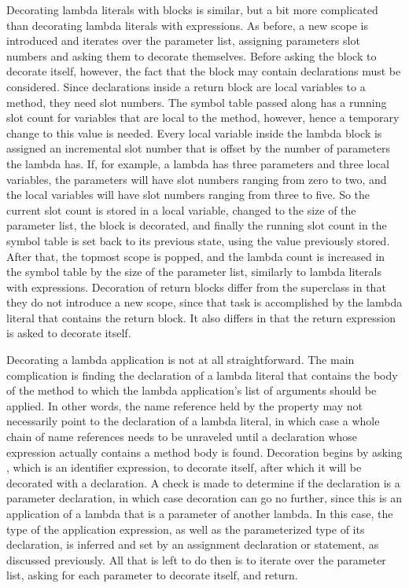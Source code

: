 Decorating lambda literals with blocks is similar, but a bit more complicated than decorating lambda literals with expressions. As before, a new scope is introduced and  iterates over the parameter list, assigning parameters slot numbers and asking them to decorate themselves. Before asking the block to decorate itself, however, the fact that the block may contain declarations must be considered. Since declarations inside a return block are local variables to a method, they need slot numbers. The symbol table passed along has a running slot count for variables that are local to the  method, however, hence a temporary change to this value is needed. Every local variable inside the lambda block is assigned an incremental slot number that is offset by the number of parameters the lambda has. If, for example, a lambda has three parameters and three local variables, the parameters will have slot numbers ranging from zero to two, and the local variables will have slot numbers ranging from three to five. So the current slot count is stored in a local variable, changed to the size of the parameter list, the block is decorated, and finally the running slot count in the symbol table is set back to its previous state, using the value previously stored. After that, the topmost scope is popped, and the lambda count is increased in the symbol table by the size of the parameter list, similarly to lambda literals with expressions. Decoration of return blocks differ from the  superclass in that they do not introduce a new scope, since that task is accomplished by the lambda literal that contains the return block. It also differs in that the return expression is asked to decorate itself.

Decorating a lambda application is not at all straightforward. The main complication is finding the declaration of a lambda literal that contains the body of the method to which the lambda application's list of arguments should be applied. In other words, the name reference held by the  property may not necessarily point to the declaration of a lambda literal, in which case a whole chain of name references needs to be unraveled until a declaration whose expression actually contains a method body is found. Decoration begins by asking , which is an identifier expression, to decorate itself, after which it will be decorated with a declaration. A check is made to determine if the declaration is a parameter declaration, in which case decoration can go no further, since this is an application of a lambda that is a parameter of another lambda. In this case, the type of the application expression, as well as the parameterized type of its declaration, is inferred and set by an assignment declaration or statement, as discussed previously. All that is left to do then is to iterate over the parameter list, asking for each parameter to decorate itself, and return.

